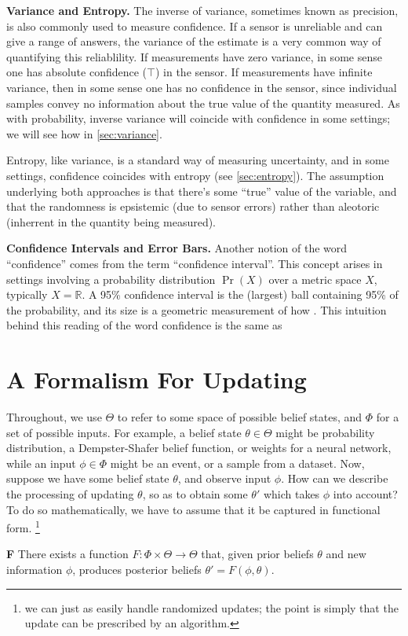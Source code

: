 \documentclass{uai2023}
\theoremstyle{plain}
\theoremstyle{definition}
\begin{document}
{	\textbf{Variance and Entropy.}
	The inverse of variance, sometimes known as precision,
		is also commonly used to measure confidence.
	If a sensor is unreliable and can give a range of answers, the variance of the estimate is a very common way of quantifying this reliablility.
	If measurements have zero variance, in some sense one has absolute confidence ($\top$) in the sensor. If measurements have infinite variance, then in some sense one has no confidence in the sensor, since individual samples convey no information about the true value of the quantity measured.
	As with probability, inverse variance will coincide with confidence in some settings; we will see how in \cref{sec:variance}.

	Entropy, like variance, is a standard way of measuring uncertainty, and in some settings, confidence coincides with entropy (see \cref{sec:entropy}).
	The assumption underlying both approaches is that there's some ``true'' value of the variable, and that the randomness is epsistemic (due to sensor errors) rather than aleotoric (inherrent in the quantity being measured).

	\textbf{Confidence Intervals and Error Bars.}
	Another notion of the word ``confidence'' comes from the term ``confidence interval''.
	This concept arises in settings involving a probability distribution $\Pr(X)$ over a metric space $X$, typically $X = \mathbb R$.
	A 95\% confidence interval is the (largest) ball containing 95\% of the probability, and its size is a geometric measurement of how .
	This intuition behind this reading of the word confidence is the same as
}
 
\section{A Formalism For Updating}

Throughout, we use $\Theta$ to refer to some space of possible belief states,
and $\Phi$ for a set of possible inputs. 
For example, a belief state $\theta \in \Theta$
might be probability distribution,
a Dempster-Shafer belief function, or
weights for a neural network,
while an input $\phi \in \Phi$ might be an event, or a sample from a dataset. 
Now, suppose we have some belief state $\theta$, and observe input $\phi$. 
How can we describe the processing of updating $\theta$, so as to obtain some $\theta'$ which takes $\phi$ into account?
To do so mathematically, we have to assume that it be captured in functional form.
\unskip\footnote{we can just as easily handle randomized updates;
	the point is simply that the update can be prescribed by an algorithm.}
\begin{CFaxioms}
	\item[\textbf{F}]
There exists a function $F : \Phi \times \Theta \to \Theta$ that,
		given prior beliefs $\theta$ and new information $\phi$, produces 
		posterior beliefs $\theta' = F(\phi, \theta)$.
\end{CFaxioms}
\end{document}
